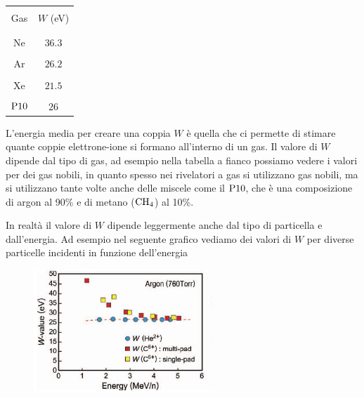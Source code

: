 \vspace{0.4cm}

\begin{minipage}{0.245\textwidth}
   \begin{center}
      \begin{tabular}{|c|c|}
         \hline
         &\\[-0.4cm]
         Gas & $W$ (eV)\\[0.1mm]
         &\\[-0.4cm]
         \hline
         &\\[-0.4cm]
         Ne & $36.3$\\[0.1mm]
         \hline
         &\\[-0.4cm]
         Ar & $26.2$\\[0.1mm]
         \hline
         &\\[-0.4cm]
         Xe & $21.5$\\[0.1mm]
         \hline
         &\\[-0.4cm]
         $\rm P10$ & $26$\\[0.1mm]
         \hline
      \end{tabular}
   \end{center}
\end{minipage}
\begin{minipage}{0.75\textwidth}
   L'energia media per creare una coppia $W$ è quella che ci permette di stimare quante coppie elettrone-ione si formano all'interno di un gas. Il valore di $W$ dipende dal tipo di gas, ad esempio nella tabella a fianco possiamo vedere i valori per dei gas nobili, in quanto spesso nei rivelatori a gas si utilizzano gas nobili, ma si utilizzano tante volte anche delle miscele come il $\rm P10$, che è una composizione di argon al 90\% e di metano ($\rm CH_4$) al 10\%.
\end{minipage}

\vspace{0.4cm}

In realtà il valore di $W$ dipende leggermente anche dal tipo di particella e dall'energia. Ad esempio nel seguente grafico vediamo dei valori di $W$ per diverse particelle incidenti in funzione dell'energia

\begin{figure}[H]
   \centering
   \includegraphics[width=0.6\textwidth]{immagini/vallori_W_energia.png}
\end{figure}

